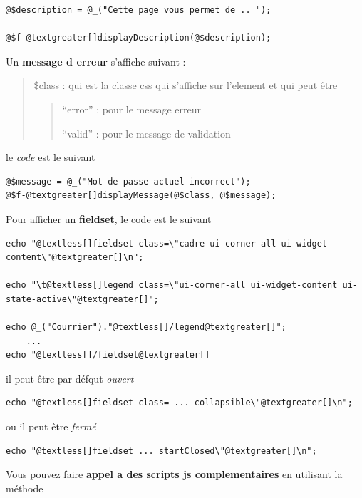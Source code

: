 \documentclass[letterpaper,10pt,french]{manual}
\begin{document}
\begin{Verbatim}[commandchars=@\[\]]
@$description = @_("Cette page vous permet de .. ");

@$f-@textgreater[]displayDescription(@$description);
\end{Verbatim}

Un \textbf{message d erreur} s'affiche suivant :
\begin{quote}

\$class : qui est la classe css qui s'affiche sur l'element et qui peut être
\begin{quote}

``error'' : pour le message erreur

``valid'' : pour le message de validation
\end{quote}
\end{quote}

le \emph{code} est le suivant

\begin{Verbatim}[commandchars=@\[\]]
@$message = @_("Mot de passe actuel incorrect");
@$f-@textgreater[]displayMessage(@$class, @$message);
\end{Verbatim}

Pour afficher  un \textbf{fieldset}, le code est le suivant

\begin{Verbatim}[commandchars=@\[\]]
echo "@textless[]fieldset class=\"cadre ui-corner-all ui-widget-content\"@textgreater[]\n";

echo "\t@textless[]legend class=\"ui-corner-all ui-widget-content ui-state-active\"@textgreater[]";

echo @_("Courrier")."@textless[]/legend@textgreater[]";
    ...
echo "@textless[]/fieldset@textgreater[]
\end{Verbatim}

il peut être par défqut \emph{ouvert}

\begin{Verbatim}[commandchars=@\[\]]
echo "@textless[]fieldset class= ... collapsible\"@textgreater[]\n";
\end{Verbatim}

ou il peut être \emph{fermé}

\begin{Verbatim}[commandchars=@\[\]]
echo "@textless[]fieldset ... startClosed\"@textgreater[]\n";
\end{Verbatim}

Vous pouvez faire \textbf{appel a des scripts js complementaires} en utilisant la méthode
\end{document}
